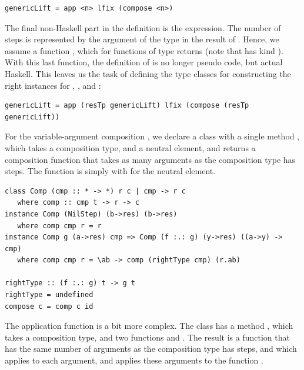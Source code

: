 \documentclass{llncs}
\begin{document}
\begin{small}
\begin{verbatim}
genericLift = app <n> lfix (compose <n>)
\end{verbatim}%
\end{small}

The final non-Haskell part in the definition is the  expression. The number of steps is represented by the argument of the  type in the result of . Hence, we assume a function , which for functions of type  returns  (note that  has kind \p{* -> *}). With this last function, the definition of  is no longer pseudo code, but actual Haskell. This leaves us the task of defining the type classes  for constructing the right instances for , , and :

\begin{small}
\begin{verbatim}
genericLift = app (resTp genericLift) lfix (compose (resTp genericLift))
\end{verbatim}%
\end{small}

For the variable-argument composition , we declare a class  with a single method , which takes a composition type, and a neutral element, and returns a composition function that takes as many arguments as the composition type has steps. The function  is simply  with  for the neutral element.

\begin{small}
\begin{verbatim}
class Comp (cmp :: * -> *) r c | cmp -> r c 
   where comp :: cmp t -> r -> c
instance Comp (NilStep) (b->res) (b->res) 
   where comp cmp r = r  
instance Comp g (a->res) cmp => Comp (f :.: g) (y->res) ((a->y) -> cmp) 
   where comp cmp r = \ab -> comp (rightType cmp) (r.ab)

rightType :: (f :.: g) t -> g t
rightType = undefined
compose c = comp c id
\end{verbatim}
\end{small}

The application function is a bit more complex. The class  has a method , which takes a composition type, and two functions  and . The result is a function that has the same number of arguments as the composition type has steps, and which applies  to each argument, and applies these arguments to the function .
\end{document}
